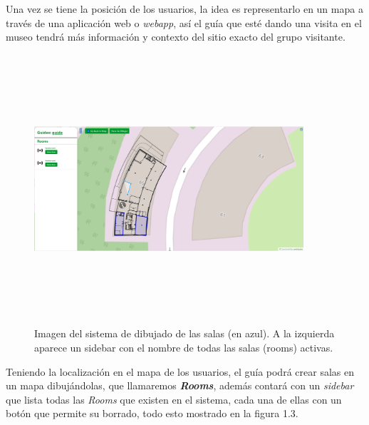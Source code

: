 Una vez se tiene la posición de los usuarios, la idea es representarlo en un mapa a través de una aplicación web o \textit{webapp}, así el guía que esté dando una visita en el museo tendrá más información y contexto del sitio exacto del grupo visitante.

\begin{figure}[t]
    \centering
    \includegraphics[width=10cm,height=10cm,keepaspectratio]{img/EditRoom.png}
    \caption{Imagen del sistema de dibujado de las salas (en azul). A la izquierda aparece un sidebar con el nombre de todas las salas (rooms) activas.}
    \label{fig:exmaple_room_editing}
\end{figure}

Teniendo la localización en el mapa de los usuarios, el guía podrá crear salas en un mapa dibujándolas, que llamaremos \textit{\textbf{Rooms}}, además contará con un \textit{sidebar} que lista todas las \textit{Rooms} que existen en el sistema, cada una de ellas con un botón que permite su borrado, todo esto mostrado en la figura 1.3.




